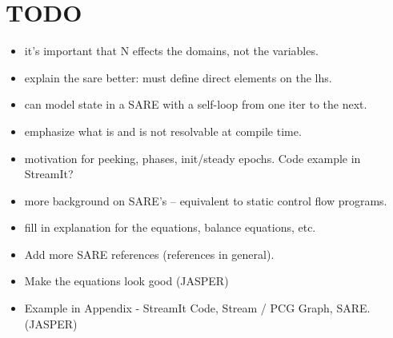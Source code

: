 \section{TODO}

\begin{itemize}

\item it's important that N effects the domains, not the variables.

\item explain the sare better:  must define direct elements on the lhs.

\item can model state in a SARE with a self-loop from one iter to the next.

\item emphasize what is and is not resolvable at compile time.

\item motivation for peeking, phases, init/steady epochs.  Code
example in StreamIt?

\item more background on SARE's -- equivalent to static control flow
programs.

\item fill in explanation for the equations, balance equations, etc.

\item Add more SARE references (references in general). 

\item Make the equations look good (JASPER)

\item Example in Appendix - StreamIt Code, Stream / PCG Graph, SARE. (JASPER)

\end{itemize}

